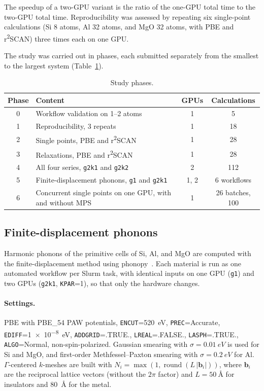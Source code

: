\documentclass[11pt,letterpaper]{article}
\begin{document}
The speedup of a two-GPU variant is the ratio of the one-GPU total time to the two-GPU total
time. Reproducibility was assessed by repeating six single-point calculations (Si 8 atoms, Al 32
atoms, and MgO 32 atoms, with PBE and r\textsuperscript{2}SCAN) three times each on one GPU.

The study was carried out in phases, each submitted separately from the smallest to the largest
system (Table~\ref{tab:phases}).

\begin{table}[htbp]
\centering
\caption{Study phases.}
\label{tab:phases}
\begin{tabular}{@{}clcc@{}}
\toprule
Phase & Content & GPUs & Calculations \\
\midrule
0 & Workflow validation on 1--2 atoms & 1 & 5 \\
1 & Reproducibility, 3 repeats & 1 & 18 \\
2 & Single points, PBE and r\textsuperscript{2}SCAN & 1 & 28 \\
3 & Relaxations, PBE and r\textsuperscript{2}SCAN & 1 & 28 \\
4 & All four series, \texttt{g2k1} and \texttt{g2k2} & 2 & 112 \\
5 & Finite-displacement phonons, \texttt{g1} and \texttt{g2k1} & 1, 2 & 6 workflows \\
6 & Concurrent single points on one GPU, with and without MPS & 1 & 26 batches, 100 \\
\bottomrule
\end{tabular}
\end{table}

\subsection{Finite-displacement phonons}
\label{sec:phonon-methods}

\sloppy
Harmonic phonons of the primitive cells of Si, Al, and MgO are computed with the
finite-displacement method using phonopy~\cite{Togo2023,Togo2015}. Each material is run as one
automated workflow per Slurm task, with identical inputs on one GPU (\texttt{g1}) and two GPUs
(\texttt{g2k1}, \texttt{KPAR}=1), so that only the hardware changes.

\paragraph{Settings.} \sloppy PBE with PBE\_54 PAW potentials, \texttt{ENCUT}=\SI{520}{eV},
\texttt{PREC}=Accurate, \texttt{EDIFF}=\SI{1e-8}{eV}, \texttt{ADDGRID}=.TRUE.,
\texttt{LREAL}=.FALSE., \texttt{LASPH}=.TRUE., \texttt{ALGO}=Normal, non-spin-polarized.
Gaussian smearing with $\sigma=\SI{0.01}{eV}$ is used for Si and MgO, and first-order
Methfessel--Paxton smearing with $\sigma=\SI{0.2}{eV}$ for Al. $\Gamma$-centered $k$-meshes
are built with $N_i = \max(1, \operatorname{round}(L\,|\mathbf{b}_i|))$, where $\mathbf{b}_i$ are
the reciprocal lattice vectors (without the $2\pi$ factor) and $L = \SI{50}{\angstrom}$ for
insulators and \SI{80}{\angstrom} for the metal.
\end{document}
